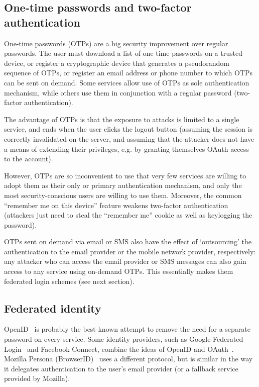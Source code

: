 \subsection{One-time passwords and two-factor authentication}

One-time passwords (OTPs) are a big security improvement over regular passwords. The user must
download a list of one-time passwords on a trusted device, or register a cryptographic device that
generates a pseudorandom sequence of OTPs, or register an email address or phone number to which
OTPs can be sent on demand. Some services allow use of OTPs as sole authentication mechanism, while
others use them in conjunction with a regular password (two-factor authentication).

The advantage of OTPs is that the exposure to attacks is limited to a single service, and ends when
the user clicks the logout button (assuming the session is correctly invalidated on the server, and
assuming that the attacker does not have a means of extending their privileges, e.g. by granting
themselves OAuth access to the account).

However, OTPs are so inconvenient to use that very few services are willing to adopt them as their
only or primary authentication mechanism, and only the most security-conscious users are willing to
use them. Moreover, the common ``remember me on this device'' feature weakens two-factor
authentication (attackers just need to steal the ``remember me'' cookie as well as keylogging the
password).

OTPs sent on demand via email or SMS also have the effect of `outsourcing' the authentication to the
email provider or the mobile network provider, respectively: any attacker who can access the email
provider or SMS messages can also gain access to any service using on-demand OTPs. This essentially
makes them federated login schemes (see next section).

\subsection{Federated identity}

OpenID~\cite{OpenID} is probably the best-known attempt to remove the need for a separate password
on every service. Some identity providers, such as Google Federated Login~\cite{GoogleOpenID} and
Facebook Connect, combine the ideas of OpenID and OAuth~\cite{OAuth}. Mozilla Persona
(BrowserID)~\cite{Persona, BrowserID} uses a different protocol, but is similar in the way it
delegates authentication to the user's email provider (or a fallback service provided by Mozilla).

